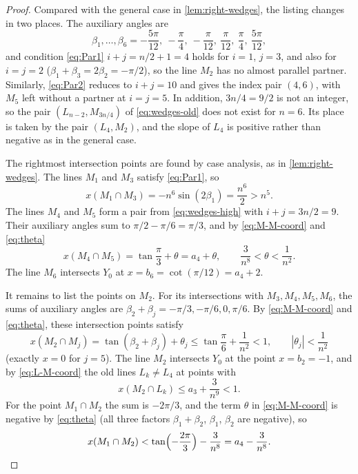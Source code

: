 \begin{proof}
Compared with the general case in \cref{lem:right-wedges}, the listing changes in two places.
The auxiliary angles are
\[
\beta_1,\ldots,\beta_6
=-\frac{5\pi}{12},\ -\frac\pi4,\ -\frac\pi{12},\
\frac\pi{12},\ \frac\pi4,\ \frac{5\pi}{12},
\]
and condition \eqref{eq:Par1} $i+j=n/2+1=4$ holds for $i=1$, $j=3$, and also for $i=j=2$ ($\beta_1 + \beta_3 = 2\beta_2=-\pi/2$), so the line $M_2$ has no almost parallel partner.
Similarly, \eqref{eq:Par2} reduces to $i+j=10$ and gives the index pair $(4,6)$, with $M_5$ left without a partner at $i=j=5$.
In addition, $3n/4=9/2$ is not an integer, so the pair $(L_{n-2},M_{3n/4})$ of \eqref{eq:wedges-old} does not exist for $n=6$.
Its place is taken by the pair $(L_4,M_2)$, and the slope of $L_4$ is positive rather than negative as in the general case.

The rightmost intersection points are found by case analysis, as in \cref{lem:right-wedges}. The lines $M_1$ and $M_3$ satisfy \eqref{eq:Par1}, so
\[
x(M_1\cap M_3)=-n^6\sin(2\beta_1)=\frac{n^6}2>n^5.
\]
The lines $M_4$ and $M_5$ form a pair from \eqref{eq:wedges-high} with $i+j=3n/2=9$. Their auxiliary angles sum to $\pi/2-\pi/6=\pi/3$, and by \eqref{eq:M-M-coord} and \eqref{eq:theta}
\[
x(M_4\cap M_5)=\tan\frac\pi3+\theta=a_4+\theta,
\qquad \frac3{n^8}<\theta<\frac1{n^2}.
\]
The line $M_6$ intersects $Y_0$ at $x=b_6=\cot(\pi/{12})=a_4+2$.

It remains to list the points on $M_2$. For its intersections with $M_3,M_4,M_5,M_6$, the sums of auxiliary angles are $\beta_2+\beta_j=-\pi/3,-\pi/6,0,\pi/6$. By \eqref{eq:M-M-coord} and \eqref{eq:theta}, these intersection points satisfy
\[
x(M_2\cap M_j)=\tan(\beta_2+\beta_j)+\theta_j\le\tan\frac\pi6+\frac1{n^2}<1,
\qquad |\theta_j|<\frac1{n^2}
\]
(exactly $x=0$ for $j=5$). The line $M_2$ intersects $Y_0$ at the point $x=b_2=-1$, and by \eqref{eq:L-M-coord} the old lines $L_k\neq L_4$ at points with
\[
x(M_2\cap L_k)\le a_3+\frac3{n^9}<1.
\]
For the point $M_1\cap M_2$ the sum is $-2\pi/3$, and the term $\theta$ in \eqref{eq:M-M-coord} is negative by \eqref{eq:theta} (all three factors $\beta_1+\beta_2$, $\beta_1$, $\beta_2$ are negative), so
\[
x(M_1\cap M_2)<\tan\Bigl(-\frac{2\pi}3\Bigr)-\frac3{n^8}=a_4-\frac3{n^8}.
\]


\end{proof}
